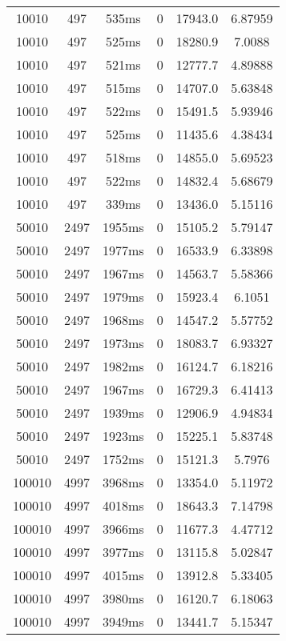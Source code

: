 \documentclass[./main.tex]{subfiles}
\begin{document}
\begin{table}
\begin{tabular}{ c | c | c | c | c | c }
        10010 & 497 & 535ms & 0 & 17943.0 & 6.87959 \\
        10010 & 497 & 525ms & 0 & 18280.9 & 7.0088 \\
        10010 & 497 & 521ms & 0 & 12777.7 & 4.89888 \\
        10010 & 497 & 515ms & 0 & 14707.0 & 5.63848 \\
        10010 & 497 & 522ms & 0 & 15491.5 & 5.93946 \\
        10010 & 497 & 525ms & 0 & 11435.6 & 4.38434 \\
        \rowcolor{lightgray} 10010 & 497 & 518ms & 0 & 14855.0 & 5.69523 \\
        10010 & 497 & 522ms & 0 & 14832.4 & 5.68679 \\
        10010 & 497 & 339ms & 0 & 13436.0 & 5.15116 \\
        \hline
        50010 & 2497 & 1955ms & 0 & 15105.2 & 5.79147 \\
        50010 & 2497 & 1977ms & 0 & 16533.9 & 6.33898 \\
        50010 & 2497 & 1967ms & 0 & 14563.7 & 5.58366 \\
        50010 & 2497 & 1979ms & 0 & 15923.4 & 6.1051 \\
        50010 & 2497 & 1968ms & 0 & 14547.2 & 5.57752 \\
        50010 & 2497 & 1973ms & 0 & 18083.7 & 6.93327 \\
        50010 & 2497 & 1982ms & 0 & 16124.7 & 6.18216 \\
        50010 & 2497 & 1967ms & 0 & 16729.3 & 6.41413 \\
        50010 & 2497 & 1939ms & 0 & 12906.9 & 4.94834 \\
        \rowcolor{lightgray} 50010 & 2497 & 1923ms & 0 & 15225.1 & 5.83748 \\
        50010 & 2497 & 1752ms & 0 & 15121.3 & 5.7976 \\
        \hline
        100010 & 4997 & 3968ms & 0 & 13354.0 & 5.11972 \\
        100010 & 4997 & 4018ms & 0 & 18643.3 & 7.14798 \\
        100010 & 4997 & 3966ms & 0 & 11677.3 & 4.47712 \\
        100010 & 4997 & 3977ms & 0 & 13115.8 & 5.02847 \\
        100010 & 4997 & 4015ms & 0 & 13912.8 & 5.33405 \\
        100010 & 4997 & 3980ms & 0 & 16120.7 & 6.18063 \\
        100010 & 4997 & 3949ms & 0 & 13441.7 & 5.15347 \\

\end{tabular}
\end{table}
\end{document}
